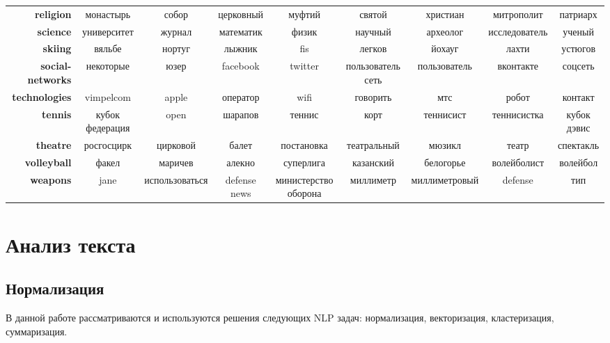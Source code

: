 \documentclass[a4paper, 14pt]{extarticle}
\begin{document}
\begin{table}[h]
{\begin{tabular}{r|cccccccc}
			\textbf{religion}        &          монастырь &           собор &          церковный &                муфтий &                святой &       христиан &       митрополит &        патриарх \\
			\textbf{science}         &        университет &          журнал &          математик &                 физик &               научный &       археолог &    исследователь &          ученый \\
			\textbf{skiing}          &             вяльбе &          нортуг &             лыжник &                   fis &                легков &         йохауг &            лахти &         устюгов \\
			\textbf{social-networks} &          некоторые &            юзер &           facebook &               twitter &     пользователь сеть &   пользователь &        вконтакте &         соцсеть \\
			\textbf{technologies}    &          vimpelcom &           apple &           оператор &                  wifi &              говорить &            мтс &            робот &         контакт \\
			\textbf{tennis}          &    кубок федерация &            open &            шарапов &                теннис &                  корт &      теннисист &      теннисистка &     кубок дэвис \\
			\textbf{theatre}         &         росгосцирк &        цирковой &              балет &            постановка &           театральный &         мюзикл &            театр &       спектакль \\
			\textbf{volleyball}      &              факел &         маричев &             алекно &             суперлига &             казанский &      белогорье &      волейболист &        волейбол \\
			\textbf{weapons}         &               jane &  использоваться &       defense news &  министерство оборона &             миллиметр &  миллиметровый &          defense &             тип \\
		\end{tabular}
		}
	\label{word_feachers}
\end{table}


\section{Анализ текста}
\subsection{Нормализация}
В данной работе рассматриваются и используются решения следующих NLP задач: нормализация, векторизация, кластеризация, суммаризация.
\end{document}
